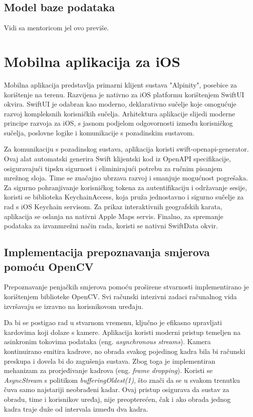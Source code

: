 \subsection{Model baze podataka}
Vidi sa mentoricom jel ovo previše.

\section{Mobilna aplikacija za iOS}

Mobilna aplikacija predstavlja primarni klijent sustava "Alpinity", posebice za korištenje na terenu. Razvijena je nativno za iOS platformu korištenjem SwiftUI okvira. SwiftUI je odabran kao moderno, deklarativno sučelje koje omogućuje razvoj kompleksnih korisničkih sučelja. Arhitektura aplikacije slijedi moderne principe razvoja za iOS, s jasnom podjelom odgovornosti između korisničkog sučelja, poslovne logike i komunikacije s pozadinskim sustavom. 

Za komunikaciju s pozadinskog sustava, aplikacija koristi swift-openapi-generator. Ovaj alat automatski generira Swift klijentski kod iz OpenAPI specifikacije, osiguravajući tipsku sigurnost i eliminirajući potrebu za ručnim pisanjem mrežnog sloja. Time se značajno ubrzava razvoj i smanjuje mogućnost pogrešaka. Za sigurno pohranjivanje korisničkog tokena za autentifikaciju i održavanje sesije, koristi se biblioteka KeychainAccess, koja pruža jednostavno i sigurno sučelje za rad s iOS Keychain servisom. Za prikaz interaktivnih geografskih karata, aplikacija se oslanja na nativni Apple Maps servis. Finalno, za spremanje podataka za izvanmrežni način rada, koristi se nativni SwiftData okvir.

\subsection{Implementacija prepoznavanja smjerova pomoću OpenCV}

Prepoznavanje penjačkih smjerova pomoću proširene stvarnosti implementirano je korištenjem biblioteke OpenCV. Svi računski intezivni zadaci računalnog vida izvršavaju se izravno na korisnikovom uređaju.

Da bi se postigao rad u stvarnom vremenu, ključno je efikasno upravljati kardovima koji dolaze s kamere. Aplikacija koristi moderni pristup temeljen na asinkronim tokovima podataka (eng. \textit{asynchronous streams}). Kamera kontinuirano emitira kadrove, no obrada svakog pojedinog kadra bila bi računski preskupa i dovela bi do zagušenja sustava. Zbog toga je implementiran mehanizam za prorjeđivanje kadrova (eng. \textit{frame dropping}). 
Koristi se \textit{AsyncStream} s politikom \textit{bufferingOldest(1)}, što znači da se u svakom trenutku čuva samo najstariji neobrađeni kadar. Ovaj pristup osigurava da sustav za obradu, time i korisnikov uređaj, nije preopterećen, čak i ako obrada jednog kadra traje duže od intervala između dva kadra.

